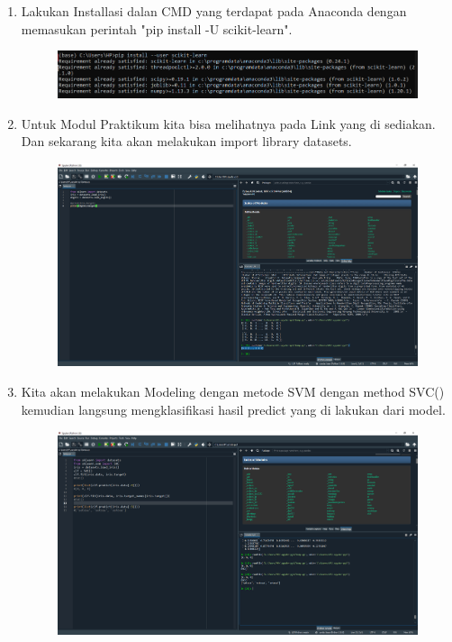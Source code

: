 \begin{enumerate}
\item Lakukan Installasi dalan CMD yang terdapat pada Anaconda dengan memasukan perintah "pip install -U scikit-learn".
\begin{figure}[!htbp]
	\centering
	\includegraphics[scale=0.6]{figures/installscikitlearn.png}
\end{figure}
\item Untuk Modul Praktikum kita bisa melihatnya pada Link yang di sediakan. Dan sekarang kita akan melakukan import library datasets.
\begin{figure}[!htbp]
	\centering
	\includegraphics[scale=0.3]{figures/1.png}
\end{figure}
\newpage
\item Kita akan melakukan Modeling dengan metode SVM dengan method SVC() kemudian langsung mengklasifikasi hasil predict yang di lakukan dari model.
\begin{figure}[!htbp]
	\centering
	\includegraphics[scale=0.3]{figures/2.png}

\end{figure}
\end{enumerate}
